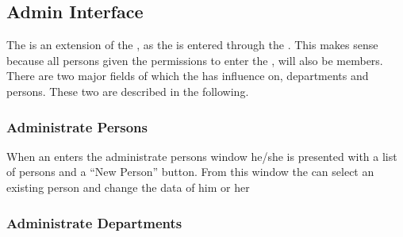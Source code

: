 \subsection{Admin Interface}
\label{sec:admininterface}

The \ainterface[] is an extension of the \sinterface[], as the \ainterface[] is entered through the \sinterface[].
This makes sense because all persons given the permissions to enter the \ainterface[], will also be \astaff[] members.
There are two major fields of which the \admin[] has influence on, departments and persons.
These two are described in the following.

\subsubsection{Administrate Persons}
When an \admin[] enters the administrate persons window he/she is presented with a list of persons and a ``New Person'' button.
From this window the \admin[] can select an existing person and change the data of him or her 

\subsubsection{Administrate Departments}









\begin{comment}
\begin{itemize}
	\item department, including:
	\begin{itemize}
		\item categories
		\item tags
	\end{itemize}
	\item persons
\end{itemize}
\end{comment}